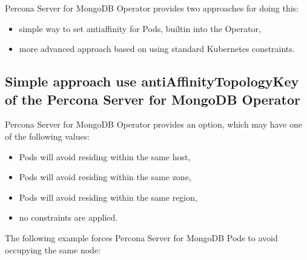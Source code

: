 \documentclass[letterpaper,10pt,english]{sphinxmanual}
\begin{document}
Percona Server for MongoDB Operator provides two approaches for doing
this:
\begin{itemize}
\item {} 
simple way to set anti\sphinxhyphen{}affinity for Pods, built\sphinxhyphen{}in into the Operator,

\item {} 
more advanced approach based on using standard Kubernetes
constraints.

\end{itemize}


\subsection{Simple approach \sphinxhyphen{} use antiAffinityTopologyKey of the Percona Server for MongoDB Operator}
\label{\detokenize{constraints:simple-approach-use-antiaffinitytopologykey-of-the-percona-server-for-mongodb-operator}}
Percona Server for MongoDB Operator provides an
 option, which may have one of the following
values:
\begin{itemize}
\item {} 
 \sphinxhyphen{} Pods will avoid residing within the same
host,

\item {} 
 \sphinxhyphen{} Pods will avoid residing
within the same zone,

\item {} 
 \sphinxhyphen{} Pods will avoid
residing within the same region,

\item {} 
 \sphinxhyphen{} no constraints are applied.

\end{itemize}

The following example forces Percona Server for MongoDB Pods to avoid
occupying the same node:

\begin{sphinxVerbatim}[commandchars=\\\{\}]
   
\end{sphinxVerbatim}
\end{document}
